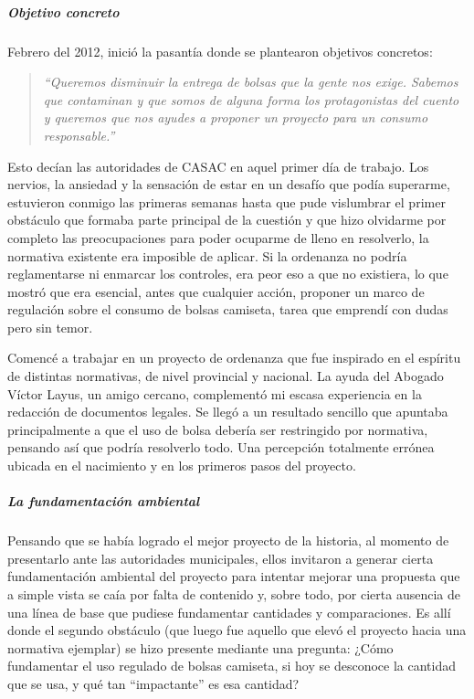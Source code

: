 \documentclass[
]{article}
\begin{document}
\hypertarget{objetivo-concreto}{%
\subparagraph{\texorpdfstring{\textbf{Objetivo
concreto}}{Objetivo concreto}}\label{objetivo-concreto}}

Febrero del 2012, inició la pasantía donde se plantearon objetivos
concretos:

\begin{quote}
\emph{``Queremos disminuir la entrega de bolsas que la gente nos exige.
Sabemos que contaminan y que somos de alguna forma los protagonistas del
cuento y queremos que nos ayudes a proponer un proyecto para un consumo
responsable.''}
\end{quote}

Esto decían las autoridades de CASAC en aquel primer día de trabajo. Los
nervios, la ansiedad y la sensación de estar en un desafío que podía
superarme, estuvieron conmigo las primeras semanas hasta que pude
vislumbrar el primer obstáculo que formaba parte principal de la
cuestión y que hizo olvidarme por completo las preocupaciones para poder
ocuparme de lleno en resolverlo, la normativa existente era imposible de
aplicar. Si la ordenanza no podría reglamentarse ni enmarcar los
controles, era peor eso a que no existiera, lo que mostró que era
esencial, antes que cualquier acción, proponer un marco de regulación
sobre el consumo de bolsas camiseta, tarea que emprendí con dudas pero
sin temor.

Comencé a trabajar en un proyecto de ordenanza que fue inspirado en el
espíritu de distintas normativas, de nivel provincial y nacional. La
ayuda del Abogado Víctor Layus, un amigo cercano, complementó mi escasa
experiencia en la redacción de documentos legales. Se llegó a un
resultado sencillo que apuntaba principalmente a que el uso de bolsa
debería ser restringido por normativa, pensando así que podría
resolverlo todo. Una percepción totalmente errónea ubicada en el
nacimiento y en los primeros pasos del proyecto.

\hypertarget{la-fundamentaciuxf3n-ambiental}{%
\subparagraph{\texorpdfstring{\textbf{La fundamentación
ambiental}}{La fundamentación ambiental}}\label{la-fundamentaciuxf3n-ambiental}}

Pensando que se había logrado el mejor proyecto de la historia, al
momento de presentarlo ante las autoridades municipales, ellos invitaron
a generar cierta fundamentación ambiental del proyecto para intentar
mejorar una propuesta que a simple vista se caía por falta de contenido
y, sobre todo, por cierta ausencia de una línea de base que pudiese
fundamentar cantidades y comparaciones. Es allí donde el segundo
obstáculo (que luego fue aquello que elevó el proyecto hacia una
normativa ejemplar) se hizo presente mediante una pregunta: ¿Cómo
fundamentar el uso regulado de bolsas camiseta, si hoy se desconoce la
cantidad que se usa, y qué tan ``impactante'' es esa cantidad?
\end{document}
